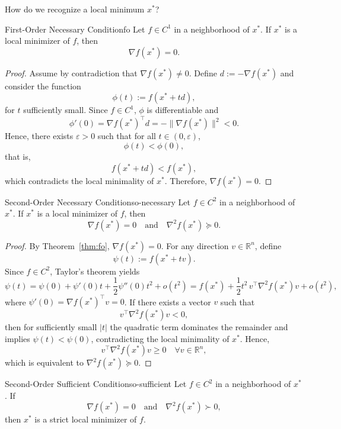 \documentclass[11pt]{article}
\begin{document}
How do we recognize a local minimum $x^*$?

\begin{theorem}{First-Order Necessary Condition}{fo}
Let \(f \in C^1\) in a neighborhood of \(x^*\).  
If \(x^*\) is a local minimizer of \(f\), then
\[
\nabla f(x^*) = 0.
\]
\end{theorem}

\begin{proof}
Assume by contradiction that \(\nabla f(x^*) \neq 0\).  
Define \(d := -\nabla f(x^*)\) and consider the function
\[
\phi(t) := f(x^* + t d),
\]
for \(t\) sufficiently small. Since \(f \in C^1\), \(\phi\) is differentiable and
\[
\phi'(0) = \nabla f(x^*)^\top d = -\|\nabla f(x^*)\|^2 < 0.
\]
Hence, there exists \(\varepsilon > 0\) such that for all \(t \in (0,\varepsilon)\),
\[
\phi(t) < \phi(0),
\]
that is,
\[
f(x^* + t d) < f(x^*),
\]
which contradicts the local minimality of \(x^*\). Therefore, \(\nabla f(x^*) = 0\).
\end{proof}

\begin{theorem}{Second-Order Necessary Condition}{so-necessary}
Let \(f \in C^2\) in a neighborhood of \(x^*\).  
If \(x^*\) is a local minimizer of \(f\), then
\[
\nabla f(x^*) = 0
\quad \text{and} \quad
\nabla^2 f(x^*) \succeq 0.
\]
\end{theorem}

\begin{proof}
By Theorem~\ref{thm:fo}, \(\nabla f(x^*) = 0\).  
For any direction \(v \in \mathbb{R}^n\), define
\[
\psi(t) := f(x^* + t v).
\]
Since \(f \in C^2\), Taylor's theorem yields
\[
\psi(t)
= \psi(0) + \psi'(0)t + \frac{1}{2}\psi''(0)t^2 + o(t^2)
= f(x^*) + \frac{1}{2} t^2 \, v^\top \nabla^2 f(x^*) v + o(t^2),
\]
where \(\psi'(0) = \nabla f(x^*)^\top v = 0\).
If there exists a vector \(v\) such that
\[
v^\top \nabla^2 f(x^*) v < 0,
\]
then for sufficiently small \(|t|\) the quadratic term dominates the remainder
and implies \(\psi(t) < \psi(0)\), contradicting the local minimality of \(x^*\).
Hence,
\[
v^\top \nabla^2 f(x^*) v \ge 0 \quad \forall v \in \mathbb{R}^n,
\]
which is equivalent to \(\nabla^2 f(x^*) \succeq 0\).
\end{proof}

\begin{theorem}{Second-Order Sufficient Condition}{so-sufficient}
Let \(f \in C^2\) in a neighborhood of \(x^*\).
If
\[
\nabla f(x^*) = 0
\quad \text{and} \quad
\nabla^2 f(x^*) \succ 0,
\]
then \(x^*\) is a strict local minimizer of \(f\).
\end{theorem}
\end{document}
